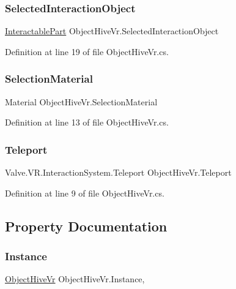\subsubsection{\texorpdfstring{SelectedInteractionObject}{SelectedInteractionObject}}
{\footnotesize\ttfamily \mbox{\hyperlink{class_interactable_part}{Interactable\+Part}} Object\+Hive\+Vr.\+Selected\+Interaction\+Object}



Definition at line 19 of file Object\+Hive\+Vr.\+cs.

\mbox{\label{class_object_hive_vr_aced5b60257918a2f678389425e0a719f}} 
\subsubsection{\texorpdfstring{SelectionMaterial}{SelectionMaterial}}
{\footnotesize\ttfamily Material Object\+Hive\+Vr.\+Selection\+Material}



Definition at line 13 of file Object\+Hive\+Vr.\+cs.

\mbox{\label{class_object_hive_vr_add58fc9fdf79c5cfab3cfad8124c2ce7}} 
\subsubsection{\texorpdfstring{Teleport}{Teleport}}
{\footnotesize\ttfamily Valve.\+V\+R.\+Interaction\+System.\+Teleport Object\+Hive\+Vr.\+Teleport}



Definition at line 9 of file Object\+Hive\+Vr.\+cs.



\subsection{Property Documentation}
\mbox{\label{class_object_hive_vr_a536da3e66f9e9f1ddc9f88a8957ff7eb}} 
\subsubsection{\texorpdfstring{Instance}{Instance}}
{\footnotesize\ttfamily \mbox{\hyperlink{class_object_hive_vr}{Object\+Hive\+Vr}} Object\+Hive\+Vr.\+Instance\hspace{0.3cm}{\ttfamily [static]}, {\ttfamily [get]}}



